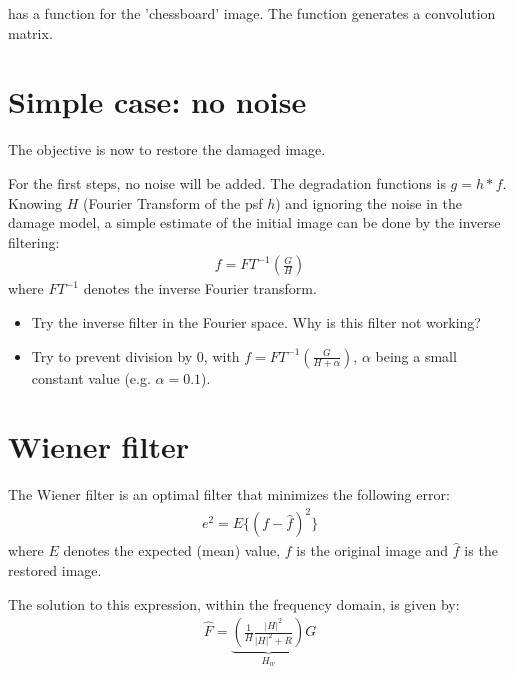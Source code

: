 \begin{mcomment}
\begin{mremark}
 \matlabregistered{} has a  function for the 'chessboard' image. The  function generates a convolution matrix.
\end{mremark}
\end{mcomment}


\section{Simple case: no noise}
The objective is now to restore the damaged image.

For the first steps, no noise will be added. The degradation functions is $g=h*f$. Knowing $H$ (Fourier Transform of the psf $h$) and ignoring the noise in the damage model, a simple estimate of the initial image can be done by the inverse filtering:
\begin{eqnarray}
f=FT^{-1}\left(\frac{G}{H}\right)
\end{eqnarray}
where $FT^{-1}$ denotes the inverse Fourier transform.

\begin{qbox}
 \begin{itemize}
  \item Try the inverse filter in the Fourier space. Why is this filter not working?
  \item Try to prevent division by 0, with $f=FT^{-1}\left(\frac{G}{H+\alpha}\right)$, $\alpha$ being a small constant value (e.g. $\alpha=0.1$).
 \end{itemize}
\end{qbox}

\section{Wiener filter}
The Wiener filter is an optimal filter that minimizes the following error:
\begin{eqnarray*}
e^2=E\{(f-\hat{f})^2\}
\end{eqnarray*}
where $E$ denotes the expected (mean) value, $f$ is the original image and $\hat{f}$ is the restored image.

The solution to this expression, within the frequency domain, is given by:
\begin{eqnarray*}
\hat{F}=\underbrace{\left(\frac{1}{H}\frac{|H|^2}{|H|^2+R}\right)}_{H_w}G
\end{eqnarray*}

